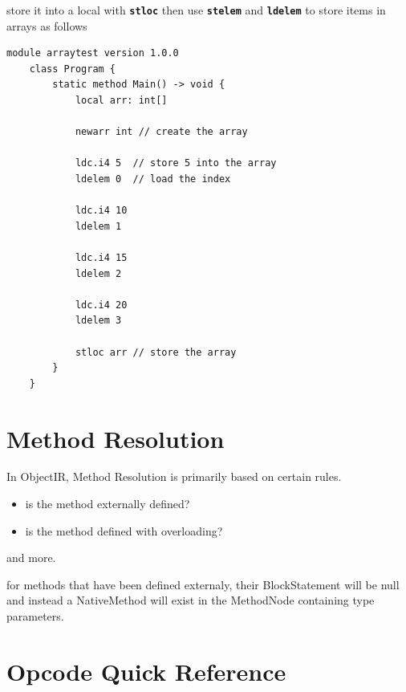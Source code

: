 \documentclass[11pt,a4paper]{article}
\newcommand{\opcode}[1]{\textbf{\texttt{#1}}}
\begin{document}
store it into a local with \opcode{stloc}
then use \opcode{stelem} and \opcode{ldelem} to store items in arrays as follows

\begin{lstlisting}[style=textir, caption={array example}]
	module arraytest version 1.0.0
	class Program {
		static method Main() -> void {
			local arr: int[]
			
			newarr int // create the array
			
			ldc.i4 5  // store 5 into the array
			ldelem 0  // load the index
			
			ldc.i4 10 
			ldelem 1 
			
			ldc.i4 15 
			ldelem 2
			
			ldc.i4 20 
			ldelem 3 
			
			stloc arr // store the array
		}
	}
\end{lstlisting}


\section{Method Resolution}
\label{sec:methodresolution}

In ObjectIR, Method Resolution is primarily based on certain rules.

\begin{itemize}
	\item is the method externally defined?
	\item is the method defined with overloading?
	\end{itemize}
	and more.
	
	for methods that have been defined externaly, their BlockStatement will be null and instead a NativeMethod will exist in the MethodNode containing type parameters.
	
\section{Opcode Quick Reference}
\label{app:opcodes}
\end{document}
